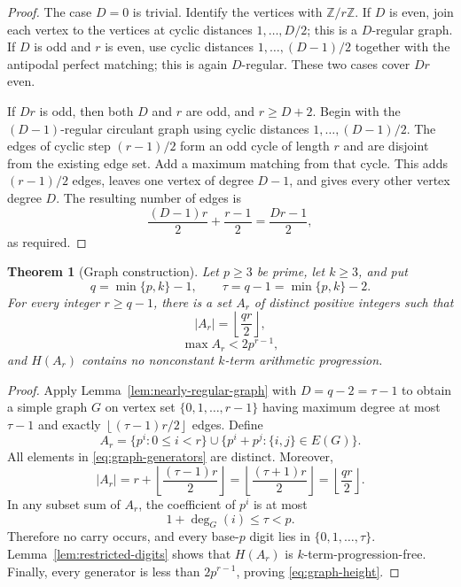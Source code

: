 \documentclass[11pt]{article}
\numberwithin{equation}{section}
\newtheorem{theorem}{Theorem}[section]
\theoremstyle{definition}
\theoremstyle{remark}
\newcommand{\Z}{\mathbb{Z}}
\newcommand{\floor}[1]{\left\lfloor #1\right\rfloor}
\begin{document}
\begin{proof}
The case $D=0$ is trivial. Identify the vertices with $\Z/r\Z$. If $D$ is even, join each vertex to the vertices at cyclic distances $1,\ldots,D/2$; this is a $D$-regular graph. If $D$ is odd and $r$ is even, use cyclic distances $1,\ldots,(D-1)/2$ together with the antipodal perfect matching; this is again $D$-regular. These two cases cover $Dr$ even.

\bigskip
\noindent
If $Dr$ is odd, then both $D$ and $r$ are odd, and $r\ge D+2$. Begin with the $(D-1)$-regular circulant graph using cyclic distances $1,\ldots,(D-1)/2$. The edges of cyclic step $(r-1)/2$ form an odd cycle of length $r$ and are disjoint from the existing edge set. Add a maximum matching from that cycle. This adds $(r-1)/2$ edges, leaves one vertex of degree $D-1$, and gives every other vertex degree $D$. The resulting number of edges is
\[
\frac{(D-1)r}{2}+\frac{r-1}{2}=\frac{Dr-1}{2},
\]
as required.
\end{proof}

\begin{theorem}[Graph construction]\label{thm:graph-construction}
Let $p\ge3$ be prime, let $k\ge3$, and put
\begin{equation}\label{eq:digit-capacity}
q=\min\{p,k\}-1,
\qquad
\tau=q-1=\min\{p,k\}-2.
\end{equation}
For every integer $r\ge q-1$, there is a set $A_r$ of distinct positive integers such that
\begin{equation}\label{eq:graph-size}
|A_r|=\floor{\frac{qr}{2}},
\end{equation}
\begin{equation}\label{eq:graph-height}
\max A_r<2p^{r-1},
\end{equation}
and $H(A_r)$ contains no nonconstant $k$-term arithmetic progression.
\end{theorem}

\begin{proof}
Apply Lemma~\ref{lem:nearly-regular-graph} with $D=q-2=\tau-1$ to obtain a simple graph $G$ on vertex set $\{0,1,\ldots,r-1\}$ having maximum degree at most $\tau-1$ and exactly $\floor{(\tau-1)r/2}$ edges. Define
\begin{equation}\label{eq:graph-generators}
A_r=\{p^i:0\le i<r\}
 \cup\{p^i+p^j:\{i,j\}\in E(G)\}.
\end{equation}
All elements in \eqref{eq:graph-generators} are distinct. Moreover,
\[
|A_r|=r+\floor{\frac{(\tau-1)r}{2}}
 =\floor{\frac{(\tau+1)r}{2}}
 =\floor{\frac{qr}{2}}.
\]
In any subset sum of $A_r$, the coefficient of $p^i$ is at most
\[
1+\deg_G(i)\le\tau<p.
\]
Therefore no carry occurs, and every base-$p$ digit lies in $\{0,1,\ldots,\tau\}$. Lemma~\ref{lem:restricted-digits} shows that $H(A_r)$ is $k$-term-progression-free. Finally, every generator is less than $2p^{r-1}$, proving \eqref{eq:graph-height}.
\end{proof}
\end{document}

